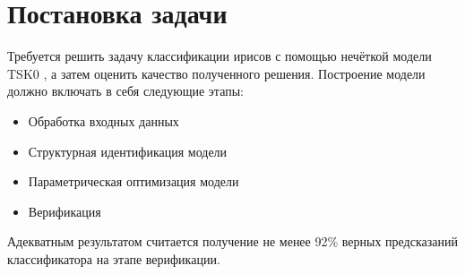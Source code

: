 \section{Постановка задачи}
Требуется решить задачу классификации ирисов \cite{irisDataset} с помощью нечёткой
модели TSK0 \cite{neuralNetworks}, а затем оценить качество полученного решения.
Построение модели должно включать в себя следующие этапы:
\begin{itemize}
  \item Обработка входных данных
  \item Структурная идентификация модели
  \item Параметрическая оптимизация модели
  \item Верификация
\end{itemize}
\par
Адекватным результатом считается получение не менее 92\% верных предсказаний
классификатора на этапе верификации.
